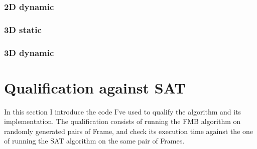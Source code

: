 \documentclass[12pt, a4paper]{article}
\begin{document}
\begin{scriptsize}
\begin{ttfamily}

\end{ttfamily}
\end{scriptsize}

\subsubsection{2D dynamic}

\begin{scriptsize}
\begin{ttfamily}

\end{ttfamily}
\end{scriptsize}

\subsubsection{3D static}

\begin{scriptsize}
\begin{ttfamily}

\end{ttfamily}
\end{scriptsize}

\subsubsection{3D dynamic}

\begin{scriptsize}
\begin{ttfamily}

\end{ttfamily}
\end{scriptsize}

\section{Qualification against SAT}

In this section I introduce the code I've used to qualify the algorithm and its implementation. The qualification consists of running the FMB algorithm on randomly generated pairs of Frame, and check its execution time against the one of running the SAT algorithm on the same pair of Frames.\\
\end{document}
